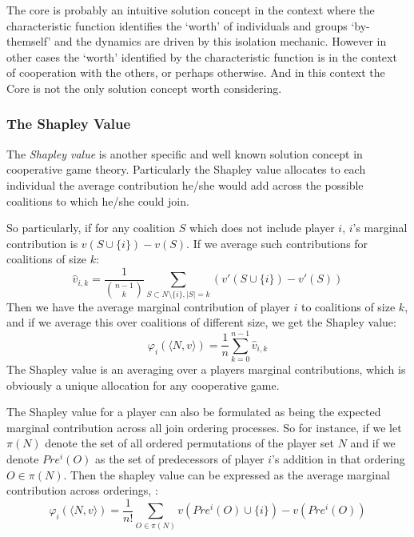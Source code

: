 The core is probably an intuitive solution concept in the context where the characteristic function identifies the `worth' of individuals and groups `by-themself' and the dynamics are driven by this isolation mechanic.
However in other cases the `worth' identified by the characteristic function is in the context of cooperation with the others, or perhaps otherwise.
And in this context the Core is not the only solution concept worth considering.

\subsubsection{The Shapley Value}

The \textit{Shapley value} is another specific and well known solution concept in cooperative game theory.
Particularly the Shapley value allocates to each individual the average contribution he/she would add across the possible coalitions to which he/she could join.

So particularly, if for any coalition $S$ which does not include player $i$, $i$'s marginal contribution is $v(S\cup\{i\}) - v(S)$. If we average such contributions for coalitions of size $k$:
\begin{equation}\label{eq:shapley_value2}
\hat{v}_{i,k} = \frac{1}{\binom{n-1}{k}}\sum_{S\subset N\setminus \{ i\} , |S|=k} %
(v'(S\cup\{i\})-v'(S))
\end{equation}
Then we have the average marginal contribution of player $i$ to coalitions of size $k$, and if we average this over coalitions of different size, we get the Shapley value:
\begin{equation}\label{shap2} \varphi_i(\langle N,v\rangle) = \frac{1}{n}\sum_{k=0}^{n-1}\hat{v}_{i,k} \end{equation}
The Shapley value is an averaging over a players marginal contributions, which is obviously a unique allocation for any cooperative game.

The Shapley value for a player can also be formulated as being the expected marginal contribution across all join ordering processes.
So for instance, if we let $\pi(N)$ denote the set of all ordered permutations of the player set $N$ and if we denote $Pre^i(O)$ as the set of predecessors of player $i$'s addition in that ordering $O\in \pi(N)$. Then the shapley value can be expressed as the average marginal contribution across orderings, \cite{weber_1988}:
\begin{equation}
    \varphi_i(\langle N,v\rangle) = \frac{1}{n!}\sum_{O\in\pi(N)}v(Pre^i(O)\cup\{i\})-v(Pre^i(O))
\end{equation}

